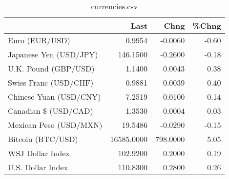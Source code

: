 \documentclass{article}%
\begin{document}
%


\begin{table}[htbp]%
\caption{currencies.csv}%
\centering%
\begin{adjustbox}{width=1\textwidth}%
\begin{tabular}{lrrr}
\toprule
                       &       Last &     Chng &  \%Chng \\
\midrule
        Euro (EUR/USD) &     0.9954 &  -0.0060 &  -0.60 \\
Japanese Yen (USD/JPY) &   146.1500 &  -0.2600 &  -0.18 \\
  U.K. Pound (GBP/USD) &     1.1400 &   0.0043 &   0.38 \\
 Swiss Franc (USD/CHF) &     0.9881 &   0.0039 &   0.40 \\
Chinese Yuan (USD/CNY) &     7.2519 &   0.0100 &   0.14 \\
  Canadian \$ (USD/CAD) &     1.3530 &   0.0004 &   0.03 \\
Mexican Peso (USD/MXN) &    19.5486 &  -0.0290 &  -0.15 \\
     Bitcoin (BTC/USD) & 16585.0000 & 798.0000 &   5.05 \\
      WSJ Dollar Index &   102.9200 &   0.2000 &   0.19 \\
     U.S. Dollar Index &   110.8300 &   0.2800 &   0.26 \\
\bottomrule
\end{tabular}
%
\end{adjustbox}%
\end{table}

%
\end{document}
